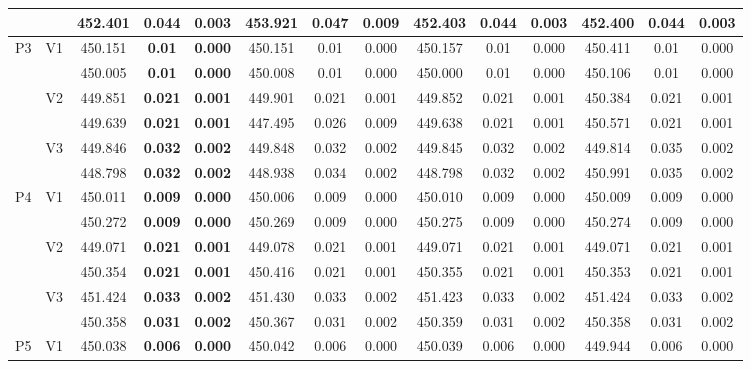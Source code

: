 \documentclass[12pt,a4paper]{article}
\begin{document}
\begin{sidewaystable}[ht]
{\begin{tabular}{cc|ccc|ccc|ccc|ccc|}
   &  & 452.401 & \textbf{0.044} & \textbf{0.003} & 453.921 & 0.047 & 0.009 & 452.403 & 0.044 & 0.003 & 452.400 & 0.044 & 0.003 \\ 
   \hline \hline\multirow{6}{*}{P3} & \multirow{2}{*}{V1} & 450.151 & \textbf{0.01} & \textbf{0.000} & 450.151 & 0.01 & 0.000 & 450.157 & 0.01 & 0.000 & 450.411 & 0.01 & 0.000 \\ 
   &  & 450.005 & \textbf{0.01} & \textbf{0.000} & 450.008 & 0.01 & 0.000 & 450.000 & 0.01 & 0.000 & 450.106 & 0.01 & 0.000 \\ 
   & \multirow{2}{*}{V2} & 449.851 & \textbf{0.021} & \textbf{0.001} & 449.901 & 0.021 & 0.001 & 449.852 & 0.021 & 0.001 & 450.384 & 0.021 & 0.001 \\ 
   &  & 449.639 & \textbf{0.021} & \textbf{0.001} & 447.495 & 0.026 & 0.009 & 449.638 & 0.021 & 0.001 & 450.571 & 0.021 & 0.001 \\ 
   & \multirow{2}{*}{V3} & 449.846 & \textbf{0.032} & \textbf{0.002} & 449.848 & 0.032 & 0.002 & 449.845 & 0.032 & 0.002 & 449.814 & 0.035 & 0.002 \\ 
   &  & 448.798 & \textbf{0.032} & \textbf{0.002} & 448.938 & 0.034 & 0.002 & 448.798 & 0.032 & 0.002 & 450.991 & 0.035 & 0.002 \\ 
   \hline \hline\multirow{6}{*}{P4} & \multirow{2}{*}{V1} & 450.011 & \textbf{0.009} & \textbf{0.000} & 450.006 & 0.009 & 0.000 & 450.010 & 0.009 & 0.000 & 450.009 & 0.009 & 0.000 \\ 
   &  & 450.272 & \textbf{0.009} & \textbf{0.000} & 450.269 & 0.009 & 0.000 & 450.275 & 0.009 & 0.000 & 450.274 & 0.009 & 0.000 \\ 
   & \multirow{2}{*}{V2} & 449.071 & \textbf{0.021} & \textbf{0.001} & 449.078 & 0.021 & 0.001 & 449.071 & 0.021 & 0.001 & 449.071 & 0.021 & 0.001 \\ 
   &  & 450.354 & \textbf{0.021} & \textbf{0.001} & 450.416 & 0.021 & 0.001 & 450.355 & 0.021 & 0.001 & 450.353 & 0.021 & 0.001 \\ 
   & \multirow{2}{*}{V3} & 451.424 & \textbf{0.033} & \textbf{0.002} & 451.430 & 0.033 & 0.002 & 451.423 & 0.033 & 0.002 & 451.424 & 0.033 & 0.002 \\ 
   &  & 450.358 & \textbf{0.031} & \textbf{0.002} & 450.367 & 0.031 & 0.002 & 450.359 & 0.031 & 0.002 & 450.358 & 0.031 & 0.002 \\ 
   \hline \hline\multirow{6}{*}{P5} & \multirow{2}{*}{V1} & 450.038 & \textbf{0.006} & \textbf{0.000} & 450.042 & 0.006 & 0.000 & 450.039 & 0.006 & 0.000 & 449.944 & 0.006 & 0.000 \\ 

\end{tabular}}
\end{sidewaystable}
\end{document}

